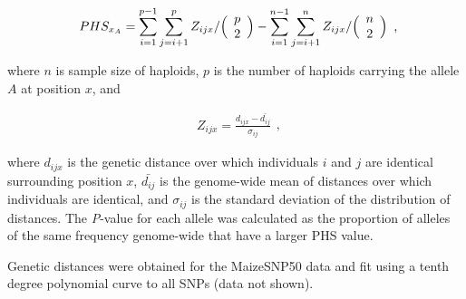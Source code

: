 \begin{equation}
  \label{phs-1}
  \begin{array}{l}
  \displaystyle{
PHS_{x_A} = \sum^{p-1}_{i=1}\sum^{p}_{j=i+1}Z_{ijx}  / \Bigl( \begin{array}{c} p \\ 2 \\ \end{array} \Bigr) 
- \sum^{n-1}_{i=1}\sum^{n}_{j=i+1}Z_{ijx}  / \Bigl( \begin{array}{c} n \\ 2 \\ \end{array} \Bigr) 
  }
  \end {array} 
  \textrm{,}
\end{equation}

\noindent where $n$ is sample size of haploids, $p$  is the number of haploids carrying the allele $A$ at position $x$, and

\begin{equation}
  \label{phs-2}
  \begin{array}{l}
  \displaystyle{
Z_{ijx} = \frac{ d_{ijx} - \bar{d_{ij}} }{ \sigma_{ij} }
  }
  \end {array} 
  \textrm{,}
\end{equation}

\noindent where $d_{ijx}$ is the genetic distance over which individuals $i$ and $j$ are identical surrounding position $x$, $\bar{d_{ij}}$ is the genome-wide mean of distances over which individuals are identical, and $\sigma_{ij}$ is the standard deviation of the distribution of distances.  
The \emph{P}-value for each allele was calculated as the proportion of alleles of the same frequency genome-wide that have a larger PHS value. 

Genetic distances were obtained for the MaizeSNP50 data \cite[]{Ganal_2011_22174790} and fit using a tenth degree polynomial curve to all SNPs (data not shown).
 


